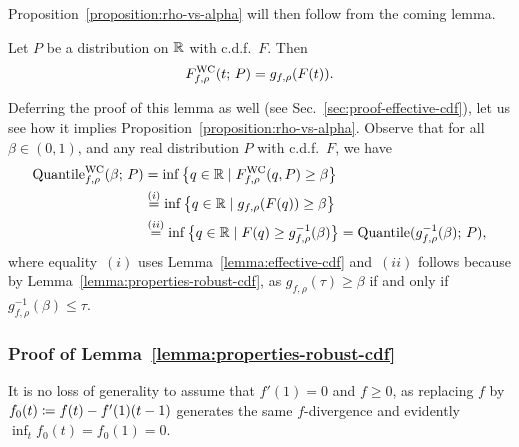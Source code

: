 Proposition~\ref{proposition:rho-vs-alpha} will then follow from the coming
lemma.
\begin{lemma}
  \label{lemma:effective-cdf}
  Let $P$ be a distribution on $\mathbb{R}$ with c.d.f.\ $F$.
  Then
  \begin{align}
    F^{\textup{WC}}_{f,\rho}(t; \, P) = g_{f,\rho}(F(t)).
  \end{align}
\end{lemma}
\noindent Deferring the proof of this lemma as well (see
Sec.~\ref{sec:proof-effective-cdf}), let us see how it implies
Proposition~\ref{proposition:rho-vs-alpha}. Observe that for all
$\beta \in (0,1)$, and any real distribution $P$ with c.d.f.\ $F$, we have
\begin{align*}
  \textup{Quantile}^{\textup{WC}}_{f,\rho}(\beta; \, P) 
  &=  
  \inf \big\{ q \in \mathbb{R} \mid F^{\textup{WC}}_{f,\rho}(q, P) \geq \beta \big\} \\
  & \stackrel{(i)}{=}
  \inf \big\{ q \in \mathbb{R} \mid g_{f,\rho}(F(q)) \ge \beta \big\} \\
  & \stackrel{(ii)}{=} \inf
  \big\{ q \in \mathbb{R} \mid F(q) \ge g_{f,\rho}^{-1}(\beta) \big\}
  = \textup{Quantile}(g_{f,\rho}^{-1}(\beta); \, P),
\end{align*}
where equality~$(i)$ uses Lemma~\ref{lemma:effective-cdf} and~$(ii)$
follows because by Lemma~\ref{lemma:properties-robust-cdf}, as
$g_{f,\rho}(\tau) \ge \beta$ if and only if $g_{f,\rho}^{-1}(\beta) \le
\tau$.


\subsubsection{Proof of Lemma~\ref{lemma:properties-robust-cdf}}
\label{sec:proof-properties-robust-cdf}
\providecommand{\persp}{_{\textup{per}}}

It is no loss of generality to assume that $f'(1) = 0$ and $f \ge 0$,
as replacing $f$ by $f_0(t) \coloneqq f(t) -f'(1)(t - 1)$ generates the same
$f$-divergence and evidently $\inf_t f_0(t) = f_0(1) = 0$.


